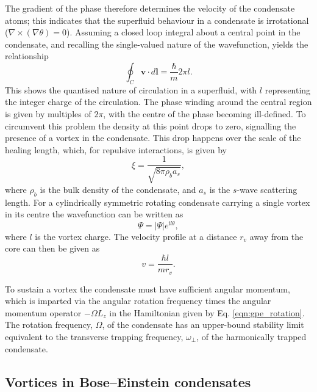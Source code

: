 The gradient of the phase therefore determines the velocity of the condensate atoms; this indicates that the superfluid behaviour in a condensate is irrotational ($\nabla\times(\nabla\theta) =0$). Assuming a closed loop integral about a central point in the condensate, and recalling the single-valued nature of the wavefunction, yields the relationship
\begin{equation}\label{eqn:circulation}
\oint_C \textbf{v}\cdot d\textbf{l} = \frac{\hbar}{m}2\pi l.
\end{equation}
This shows the quantised nature of circulation in a superfluid, with $l$ representing the integer charge of the circulation. The phase winding around the central region is given by multiples of $2\pi$, with the centre of the phase becoming ill-defined. To circumvent this problem the density at this point drops to zero, signalling the presence of a vortex in the condensate. This drop happens over the scale of the healing length, which, for repulsive interactions, is given by
\begin{equation}
\xi = \frac{1}{\sqrt{8\pi \rho_b a_s}},
\end{equation}
where $\rho_b$ is the bulk density of the condensate, and $a_s$ is the $s$-wave scattering length. For a cylindrically symmetric rotating condensate carrying a single vortex in its centre the wavefunction can be written as
\begin{equation}\label{eqn:madelung_l}
    \Psi = |\Psi|e^{\textrm{i}l\theta},
\end{equation}
where $l$ is the vortex charge. The velocity profile at a distance $r_{v}$ away from the core can then be given as
\begin{equation}\label{eqn:1_over_r}
    v =\frac{\hbar l}{m r_v}.
\end{equation}

To sustain a vortex the condensate must have sufficient angular momentum, which is imparted via the angular rotation frequency times the angular momentum operator $-\Omega L_z$ in the Hamiltonian given by Eq. \eqref{eqn:gpe_rotation}. The rotation frequency, $\Omega$, of the condensate has an upper-bound stability limit equivalent to the transverse trapping frequency, $\omega_{\perp}$, of the harmonically trapped condensate.

\subsection{Vortices in Bose--Einstein condensates}\label{ss:vorticesinbec}


